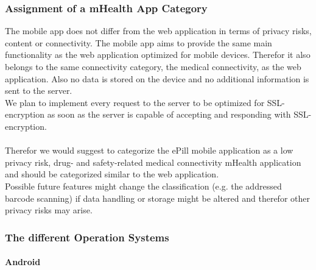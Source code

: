 \subsubsection{Assignment of a mHealth App Category}
The mobile app does not differ from the web application in terms of privacy risks, content or connectivity. The mobile app aims to provide the same main functionality as the web application optimized for mobile devices. Therefor it also belongs to the same connectivity category, the medical connectivity, as the web application. Also no data is stored on the device and no additional information is sent to the server. 
\\
We plan to implement every request to the server to be optimized for SSL-encryption as soon as the server is capable of accepting and responding with SSL-encryption. 
\\
\\
Therefor we would suggest to categorize the ePill mobile application as a low privacy risk, drug- and safety-related medical connectivity mHealth application and should be categorized similar to the web application. 
\\
Possible future features might change the classification (e.g. the addressed barcode scanning) if data handling or storage might be altered and therefor other privacy risks may arise.

\subsubsection{The different Operation Systems}
\paragraph{Android}$\;$

